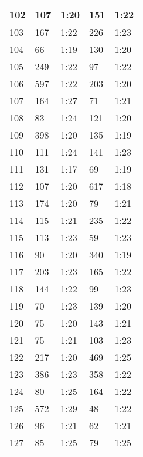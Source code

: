 \begin{center}
\begin{longtable}{|p{2cm}|l|l|l|l|}
102	&   107           &  1:20  &		151     	& 1:22 \\ \hline
103	&   167           &  1:22  &		226     	& 1:23 \\ \hline
104	&   66            &  1:19  &		130     	& 1:20 \\ \hline
105	&   249           &  1:22  &		97      	& 1:22 \\ \hline
106	&   597           &  1:22  &		203     	& 1:20 \\ \hline
107	&   164           &  1:27  &		71      	& 1:21 \\ \hline
108	&   83            &  1:24  &		121     	& 1:20 \\ \hline
109	&   398           &  1:20  &		135     	& 1:19 \\ \hline
110	&   111           &  1:24  &		141     	& 1:23 \\ \hline
111	&   131           &  1:17  &		69      	& 1:19 \\ \hline
112	&   107           &  1:20  &		617     	& 1:18 \\ \hline
113	&   174           &  1:20  &		79      	& 1:21 \\ \hline
114	&   115           &  1:21  &		235     	& 1:22 \\ \hline
115	&   113           &  1:23  &		59      	& 1:23 \\ \hline
116	&   90            &  1:20  &		340     	& 1:19 \\ \hline
117	&   203           &  1:23  &		165     	& 1:22 \\ \hline
118	&   144           &  1:22  &		99      	& 1:23 \\ \hline
119	&   70            &  1:23  &		139     	& 1:20 \\ \hline
120	&   75            &  1:20  &		143     	& 1:21 \\ \hline
121	&   75            &  1:21  &		103     	& 1:23 \\ \hline
122	&   217           &  1:20  &		469     	& 1:25 \\ \hline
123	&   386           &  1:23  &		358     	& 1:22 \\ \hline
124	&   80            &  1:25  &		164     	& 1:22 \\ \hline
125	&   572           &  1:29  &		48      	& 1:22 \\ \hline
126	&   96            &  1:21  &		62      	& 1:21 \\ \hline
127	&   85            &  1:25  &		79      	& 1:25 \\ \hline

\end{longtable}
\end{center}
